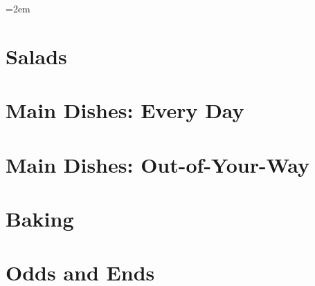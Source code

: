 \documentclass[landscape,12pt,openany]{book}
\begin{document}
\rmfamily

\setlength{\columnseprule}{0pt}
\columnsep=2em

\setcounter{tocdepth}{1}
\small
\tableofcontents

\normalsize

\setlength{\parskip}{.5em}

\chapter{Salads}











\chapter{Main Dishes: Every Day}

































\chapter{Main Dishes: Out-of-Your-Way}






\chapter{Baking}








\chapter{Odds and Ends}










\end{document}
